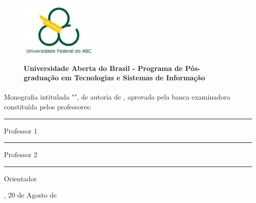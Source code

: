 \thispagestyle{empty}

\begin{figure}[!h]
	\begin{minipage}[c]{3.4cm}
		\includegraphics[height=2.7cm, keepaspectratio=true]{figuras/logo-ufabc}
	\end{minipage}
	\hfill
	\begin{minipage}[c]{20cm}
		\bfseries{
		Universidade Aberta do Brasil - {\imprimirinstituicao}
		\newline
		Programa de Pós-graduação em Tecnologias e Sistemas de Informação
	}
	\end{minipage}
\end{figure}  

\paragraph*{}
	Monografia intitulada "\emph{\imprimirtitulo}", de autoria de {\imprimirautor}, aprovada pela banca examinadora constituída pelos professores:

\vspace{3cm}

\begin{center}
	\rule{12cm}{2pt}
	
	Professor 1
	
	\vspace{2cm}
	\rule{12cm}{2pt}
	
	Professor 2
	
	\vspace{2cm}
	\rule{12cm}{2pt}
	
	Orientador
	
	{\imprimirorientador}
\end{center}

\vfill

\begin{center}
	{\imprimirlocal}, 20 de Agosto de {\imprimirdata}
\end{center}
\newpage

